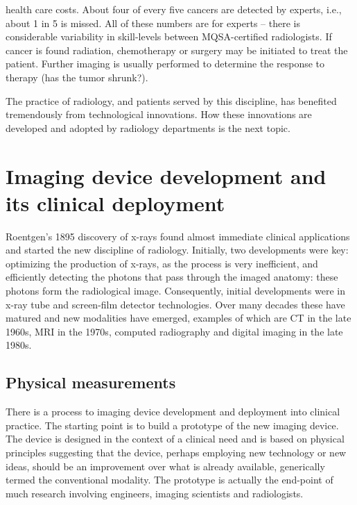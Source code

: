 \documentclass[
]{book}
\begin{document}
health care costs. About four of every five cancers are detected by experts, i.e., about 1 in 5 is missed. All of these numbers are for experts -- there is considerable variability in skill-levels between MQSA-certified radiologists. If cancer is found radiation, chemotherapy or surgery may be initiated to treat the patient. Further imaging is usually performed to determine the response to therapy (has the tumor shrunk?).

The practice of radiology, and patients served by this discipline, has benefited tremendously from technological innovations. How these innovations are developed and adopted by radiology departments is the next topic.

\hypertarget{imaging-device-development-and-its-clinical-deployment}{%
\section{Imaging device development and its clinical deployment}\label{imaging-device-development-and-its-clinical-deployment}}

Roentgen's 1895 discovery of x-rays found almost immediate clinical applications and started the new discipline of radiology. Initially, two developments were key: optimizing the production of x-rays, as the process is very inefficient, and efficiently detecting the photons that pass through the imaged anatomy: these photons form the radiological image. Consequently, initial developments were in x-ray tube and screen-film detector technologies. Over many decades these have matured and new modalities have emerged, examples of which are CT in the late 1960s, MRI in the 1970s, computed radiography and digital imaging in the late 1980s.

\hypertarget{physical-measurements}{%
\subsection{Physical measurements}\label{physical-measurements}}

There is a process to imaging device development and deployment into clinical practice. The starting point is to build a prototype of the new imaging device. The device is designed in the context of a clinical need and is based on physical principles suggesting that the device, perhaps employing new technology or new ideas, should be an improvement over what is already available, generically termed the conventional modality. The prototype is actually the end-point of much research involving engineers, imaging scientists and radiologists.
\end{document}
